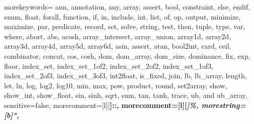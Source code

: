 

{
morekeywords={
ann, annotation, any, array, assert, bool, constraint, else, endif, enum, float, forall, function,
if, in, include, int, list, of, op, output, minimize, maximize, par, predicate, record, set,
solve, string, test, then, tuple, type, var, where,
abort, abs, acosh, array_intersect, array_union,
array1d, array2d, array3d, array4d, array5d, array6d, asin, assert, atan, bool2int, card,
ceil, combinator, concat, cos, cosh, dom, dom_array, dom_size, dominance,
fix, exp, floor, index_set, index_set_1of2,
index_set_2of2, index_set_1of3, index_set_2of3, index_set_3of3, int2float, is_fixed,
join, lb, lb_array, length, let, ln, log, log2, log10, min, max, pow, product, round, set2array,
show, show_int, show_float, sin, sinh, sqrt, sum, tan, tanh, trace, ub, and ub_array},
sensitive=false, %
morecomment=[l][\bfseries\color{orange}]{::},
morecomment=[l][\em\color{green}]{\%},
morestring=[b]",
}

